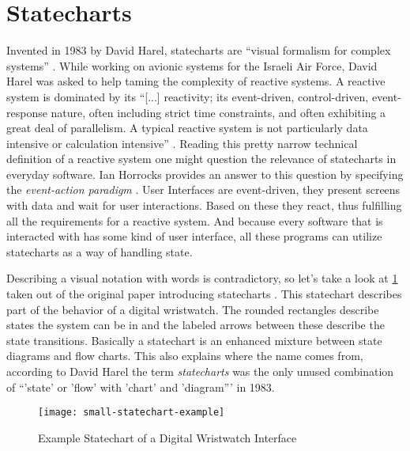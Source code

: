 \section{Statecharts}
\label{sec:statecharts}
Invented in 1983 by David Harel, statecharts are ``visual formalism for complex systems'' \autocite{harel_statecharts:_1987}.
While working on avionic systems for the Israeli Air Force, David Harel was asked to help taming the complexity of reactive systems.
A reactive system is dominated by its ``[...] reactivity; its event-driven, control-driven, event-response nature, often including strict time constraints, and often exhibiting a great deal of parallelism. A typical reactive system is not particularly data intensive or calculation intensive'' \autocite{harel_statecharts_2007}.
Reading this pretty narrow technical definition of a reactive system one might question the relevance of statecharts in everyday software.
Ian Horrocks provides an answer to this question by specifying the \emph{event-action paradigm} \autocite{horrocks_constructing_1999}.
User Interfaces are event-driven, they present screens with data and wait for user interactions.
Based on these they react, thus fulfilling all the requirements for a reactive system.
And because every software that is interacted with has some kind of user interface, all these programs can utilize statecharts as a way of handling state.

Describing a visual notation with words is contradictory, so let's take a look at \cref{fig:statecharts-example} taken out of the original paper introducing statecharts \autocite{harel_statecharts:_1987}.
This statechart describes part of the behavior of a digital wristwatch.
The rounded rectangles describe states the system can be in and the labeled arrows between these describe the state transitions.
Basically a statechart is an enhanced mixture between state diagrams and flow charts.
This also explains where the name comes from, according to David Harel the term \emph{statecharts} was the only unused combination of ``'state' or 'flow' with 'chart' and 'diagram''' in 1983.

\begin{figure}[h]
\centering
\texttt{[image: small-statechart-example]}
\caption{Example Statechart of a Digital Wristwatch Interface}
\label{fig:statecharts-example}
\end{figure}

